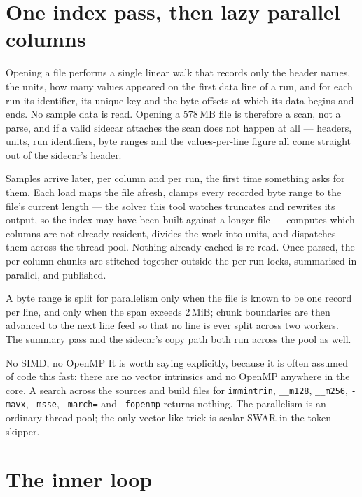\documentclass[11pt,a4paper,oneside]{report}
\newcommand{\code}[1]{\texttt{#1}}
\begin{document}
\section{One index pass, then lazy parallel columns}

Opening a file performs a single linear walk that records only the header names,
the units, how many values appeared on the first data line of a run, and for each
run its identifier, its unique key and the byte offsets at which its data begins
and ends. No sample data is read. Opening a 578\,MB file is therefore a scan, not
a parse, and if a valid sidecar attaches the scan does not happen at all ---
headers, units, run identifiers, byte ranges and the values-per-line figure all
come straight out of the sidecar's header.

Samples arrive later, per column and per run, the first time something asks for
them. Each load maps the file afresh, clamps every recorded byte range to the
file's current length --- the solver this tool watches truncates and rewrites its
output, so the index may have been built against a longer file --- computes which
columns are not already resident, divides the work into units, and dispatches
them across the thread pool. Nothing already cached is re-read. Once parsed, the
per-column chunks are stitched together outside the per-run locks, summarised in
parallel, and published.

A byte range is split for parallelism only when the file is known to be one
record per line, and only when the span exceeds 2\,MiB; chunk boundaries are then
advanced to the next line feed so that no line is ever split across two workers.
The summary pass and the sidecar's copy path both run across the pool as well.

\begin{aoenote}{No SIMD, no OpenMP}
It is worth saying explicitly, because it is often assumed of code this fast:
there are no vector intrinsics and no OpenMP anywhere in the core. A search
across the sources and build files for \code{immintrin}, \code{\_\_m128},
\code{\_\_m256}, \code{-mavx}, \code{-msse}, \code{-march=} and
\code{-fopenmp} returns nothing. The parallelism is an ordinary thread pool; the
only vector-like trick is scalar SWAR in the token skipper.
\end{aoenote}

\section{The inner loop}
\end{document}
